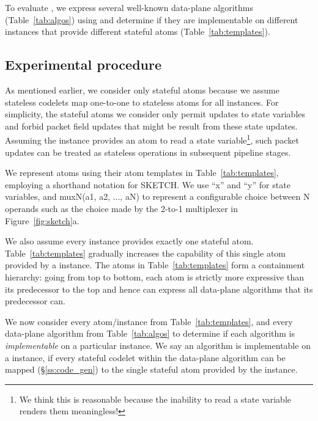 To evaluate \pktlanguage, we express several well-known data-plane algorithms
(Table~\ref{tab:algos}) using \pktlanguage and determine if they are
implementable on different \absmachine instances that provide different
stateful atoms (Table~\ref{tab:templates}).

\subsection{Experimental procedure}
As mentioned earlier, we consider only stateful atoms because we assume
stateless codelets map one-to-one to stateless atoms for all
\absmachine instances. For simplicity, the stateful atoms we consider only
permit updates to state variables and forbid packet field updates that might be
result from these state updates. Assuming the \absmachine instance provides an atom
to read a state variable\footnote{We think this is reasonable because the
inability to read a state variable renders them meaningless!}, such packet
updates can be treated as stateless operations in subsequent pipeline stages.

We represent atoms using their atom templates in Table~\ref{tab:templates},
employing a shorthand notation for SKETCH. We use ``x'' and ``y'' for state
variables, and muxN(a1, a2, ..., aN) to represent a configurable choice between
N operands such as the choice made by the 2-to-1 multiplexer in
Figure~\ref{fig:sketch}a.

We also assume every \absmachine instance provides exactly one
stateful atom.  Table~\ref{tab:templates} gradually increases the capability of
this single atom provided by a \absmachine instance.  The atoms in
Table~\ref{tab:templates} form a containment hierarchy: going from top to
bottom, each atom is strictly more expressive than its predecessor to the top
and hence can express all data-plane algorithms that its predecessor can.

We now consider every atom/\absmachine instance from Table~\ref{tab:templates},
and every data-plane algorithm from Table~\ref{tab:algos} to determine if each
algorithm is \textit{implementable} on a particular \absmachine instance. We
say an algorithm is implementable on a \absmachine instance, if every stateful
codelet within the data-plane algorithm can be mapped (\S\ref{ss:code_gen}) to
the single stateful atom provided by the \absmachine instance.

